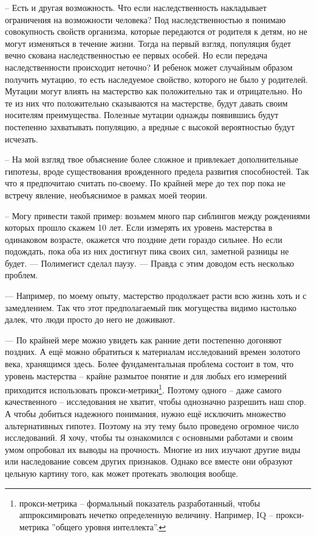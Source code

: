 \documentclass[12pt,a4paper]{article}
\begin{document}
-- Есть и другая возможность. Что если наследственность накладывает ограничения на возможности человека? Под наследственностью я понимаю совокупность свойств организма, которые передаются от родителя к детям, но не могут изменяться в течение жизни. Тогда на первый взгляд, популяция будет вечно скована наследственностью ее первых особей. Но если передача наследственности происходит неточно? И ребенок может случайным образом получить мутацию, то есть наследуемое свойство, которого не было у родителей. Мутации могут влиять на мастерство как положительно так и отрицательно. Но те из них что положительно сказываются на мастерстве, будут давать своим носителям преимущества. Полезные мутации однажды появившись будут постепенно захватывать популяцию, а вредные с высокой вероятностью будут исчезать.

-- На мой взгляд твое объяснение более сложное и привлекает дополнительные гипотезы, вроде существования врожденного предела развития способностей. Так что я предпочитаю считать по-своему. По крайней мере до тех пор пока не встречу явление, необъяснимое в рамках моей теории.

-- Могу привести такой пример: возьмем много пар сиблингов между рождениями которых прошло скажем 10 лет. Если измерять их уровень мастерства в одинаковом возрасте, окажется что поздние дети гораздо сильнее. Но если подождать, пока оба из них достигнут пика своих сил, заметной разницы не будет. --- Полимегист сделал паузу. --- Правда с этим доводом есть несколько проблем.

--- Например, по моему опыту, мастерство продолжает расти всю жизнь хоть и с замедлением. Так что этот предполагаемый пик могущества видимо настолько далек, что люди просто до него не доживают.

--- По крайней мере можно увидеть как ранние дети постепенно догоняют поздних. А ещё можно обратиться к материалам исследований времен золотого века, хранящимся здесь. Более фундаментальная проблема состоит в том, что уровень мастерства -- крайне размытое понятие и для любых его измерений приходится использовать прокси-метрики\footnote{прокси-метрика -- формальный показатель разработанный, чтобы аппроксимировать нечетко определенную величину. Например, IQ -- прокси-метрика ''общего уровня интеллекта''.}. Поэтому одного -- даже самого качественного -- исследования не хватит, чтобы однозначно разрешить наш спор. А чтобы добиться надежного понимания, нужно ещё исключить множество альтернативных гипотез. Поэтому на эту тему было проведено огромное число исследований. Я хочу, чтобы ты ознакомился с основными работами и своим умом опробовал их выводы на прочность. Многие из них изучают другие виды или наследование совсем других признаков. Однако все вместе они образуют цельную картину того, как может протекать эволюция вообще.
\end{document}
